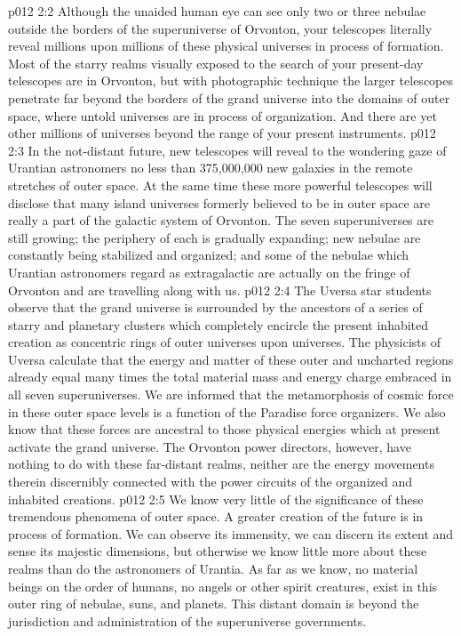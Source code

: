 \vs p012 2:2 Although the unaided human eye can see only two or three nebulae outside the borders of the superuniverse of Orvonton, your telescopes literally reveal millions upon millions of these physical universes in process of formation. Most of the starry realms visually exposed to the search of your present\hyp{}day telescopes are in Orvonton, but with photographic technique the larger telescopes penetrate far beyond the borders of the grand universe into the domains of outer space, where untold universes are in process of organization. And there are yet other millions of universes beyond the range of your present instruments.
\vs p012 2:3 In the not\hyp{}distant future, new telescopes will reveal to the wondering gaze of Urantian astronomers no less than 375,000,000 new galaxies in the remote stretches of outer space. At the same time these more powerful telescopes will disclose that many island universes formerly believed to be in outer space are really a part of the galactic system of Orvonton. The seven superuniverses are still growing; the periphery of each is gradually expanding; new nebulae are constantly being stabilized and organized; and some of the nebulae which Urantian astronomers regard as extragalactic are actually on the fringe of Orvonton and are travelling along with us.
\vs p012 2:4 \pc The Uversa star students observe that the grand universe is surrounded by the ancestors of a series of starry and planetary clusters which completely encircle the present inhabited creation as concentric rings of outer universes upon universes. The physicists of Uversa calculate that the energy and matter of these outer and uncharted regions already equal many times the total material mass and energy charge embraced in all seven superuniverses. We are informed that the metamorphosis of cosmic force in these outer space levels is a function of the Paradise force organizers. We also know that these forces are ancestral to those physical energies which at present activate the grand universe. The Orvonton power directors, however, have nothing to do with these far\hyp{}distant realms, neither are the energy movements therein discernibly connected with the power circuits of the organized and inhabited creations.
\vs p012 2:5 \pc We know very little of the significance of these tremendous phenomena of outer space. A greater creation of the future is in process of formation. We can observe its immensity, we can discern its extent and sense its majestic dimensions, but otherwise we know little more about these realms than do the astronomers of Urantia. As far as we know, no material beings on the order of humans, no angels or other spirit creatures, exist in this outer ring of nebulae, suns, and planets. This distant domain is beyond the jurisdiction and administration of the superuniverse governments.
